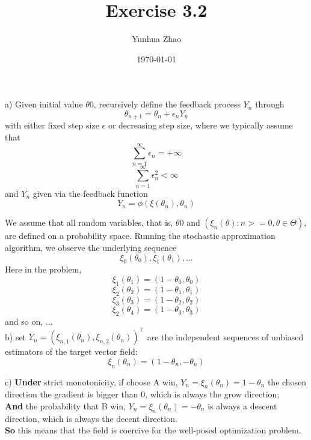 \documentclass{article}
\title{Exercise 3.2}
\author{Yunhua Zhao}
\date{\today}
\begin{document}
\maketitle

a) Given initial value $\theta0$, recursively define the feedback process ${Y_n}$ through $$ \theta_{n+1} = \theta_n+\epsilon_nY_n $$
with either fixed step size $\epsilon$ or decreasing step size, where we typically assume that 
$$ \sum_{n=1}^{\infty}\epsilon_n = +\infty $$
$$ \sum_{n=1}^{\infty}\epsilon_n^2 < \infty $$
and $Y_n$ given via the feedback function
$$ Y_n = \phi(\xi(\theta_n),\theta_n) $$
 
We assume that all random variables, that is, $\theta0$ and $ ({\xi_n(\theta):n>=0, \theta\in\Theta}) $, are defined on a probability
space. Running the stochastic approximation algorithm, we observe the underlying
sequence
$$ \xi_0(\theta_0), \xi_1(\theta_1),... $$ 
Here in the problem, 
$$ \xi_1(\theta_1) = (1-\theta_0, \theta_0) $$
$$ \xi_2(\theta_2) = (1-\theta_1, \theta_1) $$
$$ \xi_3(\theta_3) = (1-\theta_2, \theta_2) $$
$$ \xi_2(\theta_4) = (1-\theta_3, \theta_3) $$
and so on, ...  \\

b) set $Y_n=(\xi_{n,1}(\theta_n),\xi_{n,2}(\theta_n))^\intercal$ are the independent sequences of unbiased estimators of the target vector field:
$$ \xi_n(\theta_n) = (1-\theta_n, -\theta_n) $$


c) \textbf{Under} strict monotonicity, if choose A win, $Y_n=\xi_n(\theta_n) = 1-\theta_n$ the chosen direction the gradient is bigger than 0, which is always the grow direction;  \\
\textbf{And} the probability that B win,  $Y_n=\xi_n(\theta_n) = -\theta_n$ is always a descent direction, which is always the decent direction. \\
\textbf{So} this means that the field is coercive for the well-posed optimization problem. 
\end{document}

